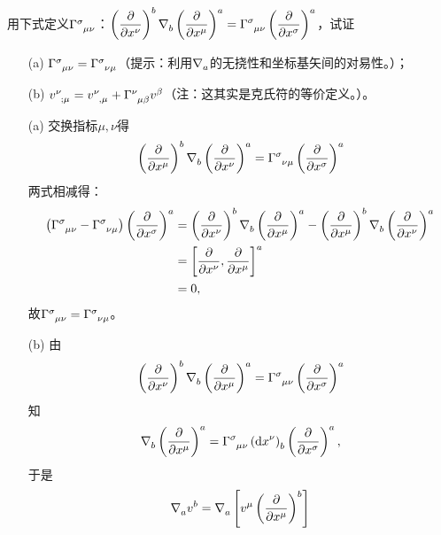 \begin{xiti}
	\item \hypertarget{3.4}{} 用下式定义$\ChristoffelSymbol{\sigma}{\mu}{\nu}$：$\displaystyle\tensor{\left(\pdv{x^\nu}\right)}{^b}\Nabla{b}\tensor{\left(\pdv{x^\mu}\right)}{^a}=\ChristoffelSymbol{\sigma}{\mu}{\nu}\tensor{\left(\pdv{x^\sigma}\right)}{^a} $，试证
	\begin{enumerate}
		\item[(a)] $\ChristoffelSymbol{\sigma}{\mu}{\nu}=\ChristoffelSymbol{\sigma}{\nu}{\mu}$（提示：利用$\Nabla{a}$的无挠性和坐标基矢间的对易性。）；
		\item[(b)] $\tensor{v}{^\nu_{;\mu}}=\tensor{v}{^\nu_{,\mu}}+\ChristoffelSymbol{\nu}{\mu}{\beta}\tensor{v}{^\beta} $（注：这其实是克氏符的等价定义。）。
	\end{enumerate}

	\begin{zm}
		\begin{enumerate}
			\item[(a)] 交换指标$\mu,\nu$得
			\begin{displaymath}
			\tensor{\left(\pdv{x^\mu}\right)}{^b}\Nabla{b}\tensor{\left(\pdv{x^\nu}\right)}{^a}=\ChristoffelSymbol{\sigma}{\nu}{\mu}\tensor{\left(\pdv{x^\sigma}\right)}{^a}
			\end{displaymath}
			两式相减得：
			\begin{align*}
			\left(  \ChristoffelSymbol{\sigma}{\mu}{\nu}-\ChristoffelSymbol{\sigma}{\nu}{\mu} \right) \tensor{\left(\pdv{x^\sigma} \right)}{^a}= &\tmu  \tensor{\left(\pdv{x^\nu}\right)}{^b} \Nabla{b} \tensor{\left(\pdv{x^\mu}\right)}{^a}-\tensor{\left(\pdv{x^\mu}\right)}{^b} \Nabla{b} \tensor{\left(\pdv{x^\nu}\right)}{^a}\\
			=&\tmu \tensor{\left[\pdv{x^\nu},\pdv{x^\mu} \right]}{^a}\\
			=&\; 0,
			\end{align*}
			故$\ChristoffelSymbol{\sigma}{\mu}{\nu}=\ChristoffelSymbol{\sigma}{\nu}{\mu} $。
			\item[(b)] 由$$\tensor{\left(\pdv{x^\nu}\right)}{^b}\Nabla{b}\tensor{\left(\pdv{x^\mu}\right)}{^a}=\ChristoffelSymbol{\sigma}{\mu}{\nu}\tensor{\left(\pdv{x^\sigma}\right)}{^a}$$知$$\Nabla{b}\tensor{\left(\pdv{x^\mu}\right)}{^a}=\ChristoffelSymbol{\sigma}{\mu}{\nu}\tensor{\left(\dd{x^\nu}\right)}{_b} \tensor{\left(\pdv{x^\sigma}\right)}{^a}, $$于是
			\begin{align*}
			\Nabla{a} \tensor{v}{^b}
			=&\; \Nabla{a} \left[ \tensor{v}{^\mu} \tensor{\left(\pdv{x^\mu}\right)}{^b} \right] \\

\end{align*}
\end{enumerate}
\end{zm}
\end{xiti}
